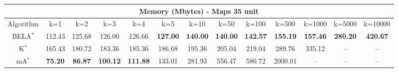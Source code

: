 \begin{tabular}{c|cccccccccccc}\toprule
\multicolumn{13}{c}{Memory (Mbytes) - Maps 35 unit}\\ \midrule
Algorithm & k=1 & k=2 & k=3 & k=4 & k=5 & k=10 & k=50 & k=100 & k=500 & k=1000 & k=5000 & k=10000 \\ \midrule
BELA$^*$ & 112.43 & 125.68 & 126.00 & 126.66 & \textbf{127.00} & \textbf{140.00} & \textbf{140.00} & \textbf{142.57} & \textbf{155.19} & \textbf{157.46} & \textbf{280.20} & \textbf{420.67} \\
K$^*$ & 165.43 & 180.72 & 183.36 & 185.36 & 186.68 & 195.36 & 205.04 & 219.04 & 289.76 & 335.12 & -- & -- \\
mA$^*$ & \textbf{75.20} & \textbf{86.87} & \textbf{100.12} & \textbf{111.88} & 133.01 & 281.93 & 556.47 & 586.72 & 2000.01 & -- & -- & -- \\ \bottomrule 
\end{tabular}
